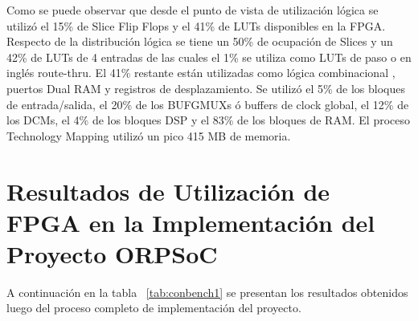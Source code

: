 	Como se puede observar que desde el punto de vista de utilización lógica se utilizó el 15\% de Slice Flip Flops y el 41\% de LUTs disponibles en
	la FPGA. Respecto de la distribución lógica se tiene un 50\% de ocupación de Slices y un 42\% de LUTs de 4 entradas de las cuales el 1\% se utiliza
	como LUTs de paso o en inglés route-thru. El 41\% restante están utilizadas como lógica combinacional , puertos Dual RAM y registros de
	desplazamiento. Se utilizó el 5\% de los bloques de entrada/salida, el 20\% de los BUFGMUXs ó buffers de clock global, el 12\% de los DCMs, el 4\% de
	los bloques DSP y el 83\% de los bloques de RAM. El proceso Technology Mapping utilizó un pico 415 MB de memoria.


\newpage
	\section{Resultados de Utilización de FPGA en la Implementación del Proyecto ORPSoC}
	
	A continuación en la tabla ~\ref{tab:conbench1} se presentan los resultados obtenidos luego del proceso completo de implementación del proyecto.
		
